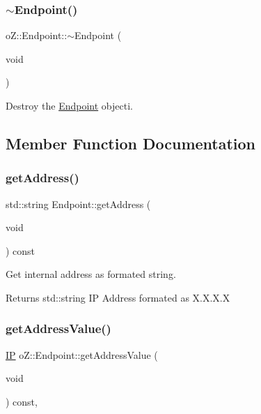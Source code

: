 \subsubsection{\texorpdfstring{$\sim$Endpoint()}{~Endpoint()}}
{\footnotesize\ttfamily o\+Z\+::\+Endpoint\+::$\sim$\+Endpoint (\begin{DoxyParamCaption}\item[{void}]{ }\end{DoxyParamCaption})\hspace{0.3cm}{\ttfamily [default]}}



Destroy the \mbox{\hyperlink{classo_z_1_1_endpoint}{Endpoint}} objecti. 



\subsection{Member Function Documentation}
\mbox{\label{classo_z_1_1_endpoint_a27a680dbcdf1c89bb10fcbaca969edab}} 
\subsubsection{\texorpdfstring{getAddress()}{getAddress()}}
{\footnotesize\ttfamily std\+::string Endpoint\+::get\+Address (\begin{DoxyParamCaption}\item[{void}]{ }\end{DoxyParamCaption}) const\hspace{0.3cm}{\ttfamily [noexcept]}}



Get internal address as formated string. 

\begin{DoxyReturn}{Returns}
std\+::string IP Address formated as \textquotesingle{}X.\+X.\+X.\+X\textquotesingle{} 
\end{DoxyReturn}
\mbox{\label{classo_z_1_1_endpoint_ad02055ec457231d4d0f316dcfa5539ba}} 
\subsubsection{\texorpdfstring{getAddressValue()}{getAddressValue()}}
{\footnotesize\ttfamily \mbox{\hyperlink{namespaceo_z_ace55c2d0182a14ceea9649d0d0cf9c4a}{IP}} o\+Z\+::\+Endpoint\+::get\+Address\+Value (\begin{DoxyParamCaption}\item[{void}]{ }\end{DoxyParamCaption}) const\hspace{0.3cm}{\ttfamily [inline]}, {\ttfamily [noexcept]}}



